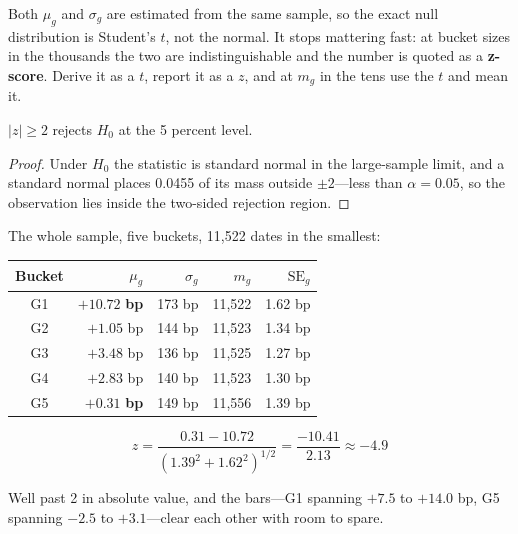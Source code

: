 \begin{note}
Both $\mu_g$ and $\sigma_g$ are estimated from the same sample, so the exact null distribution is
Student's $t$, not the normal. It stops mattering fast: at bucket sizes in the thousands the two are
indistinguishable and the number is quoted as a \textbf{z-score}. Derive it as a $t$, report it as a
$z$, and at $m_g$ in the tens use the $t$ and mean it.
\end{note}

\begin{claim}\label{clm:z-two}
$\left| z \right| \geq 2$ rejects $H_0$ at the 5 percent level.
\end{claim}

\begin{proof}
Under $H_0$ the statistic is standard normal in the large-sample limit, and a standard normal places
0.0455 of its mass outside $\pm 2$---less than $\alpha = 0.05$, so the observation lies inside the
two-sided rejection region.
\end{proof}

\begin{example}\label{ex:measured-z}
The whole sample, five buckets, 11,522 dates in the smallest:

\begin{center}
\begin{tabular}{|c|r|r|r|r|}
\hline
\textbf{Bucket} & $\mu_g$ & $\sigma_g$ & $m_g$ & $\mathrm{SE}_g$ \\ \hline
G1 & $\mathbf{+10.72}$ \textbf{bp} & 173 bp & 11,522 & 1.62 bp \\ \hline
G2 & $+1.05$ bp & 144 bp & 11,523 & 1.34 bp \\ \hline
G3 & $+3.48$ bp & 136 bp & 11,525 & 1.27 bp \\ \hline
G4 & $+2.83$ bp & 140 bp & 11,523 & 1.30 bp \\ \hline
G5 & $\mathbf{+0.31}$ \textbf{bp} & 149 bp & 11,556 & 1.39 bp \\ \hline
\end{tabular}
\end{center}

\[
  z = \frac{0.31 - 10.72}{\left( 1.39^2 + 1.62^2 \right)^{1/2}} = \frac{-10.41}{2.13} \approx -4.9
\]

Well past 2 in absolute value, and the bars---G1 spanning $+7.5$ to $+14.0$ bp, G5 spanning $-2.5$
to $+3.1$---clear each other with room to spare.
\end{example}

